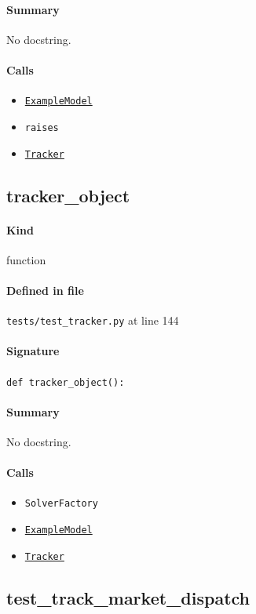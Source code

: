 \documentclass[11pt]{report}
\begin{document}
\paragraph{Summary} No docstring.
\paragraph{Calls}
\begin{itemize}[leftmargin=*]
  \item \hyperref[def:tests-util.py:ExampleModel:L25]{\texttt{ExampleModel}}
  \item \texttt{raises}
  \item \hyperref[def:tracker.py:Tracker:L19]{\texttt{Tracker}}
\end{itemize}
\subsection{tracker\_object}
\label{def:tests-test_tracker.py:tracker_object:L144}
\paragraph{Kind} function
\paragraph{Defined in file} \texttt{tests/test\_tracker.py} at line 144
\paragraph{Signature} \texttt{def tracker\_object():}
\paragraph{Summary} No docstring.
\paragraph{Calls}
\begin{itemize}[leftmargin=*]
  \item \texttt{SolverFactory}
  \item \hyperref[def:tests-util.py:ExampleModel:L25]{\texttt{ExampleModel}}
  \item \hyperref[def:tracker.py:Tracker:L19]{\texttt{Tracker}}
\end{itemize}
\subsection{test\_track\_market\_dispatch}
\label{def:tests-test_tracker.py:test_track_market_dispatch:L163}
\end{document}
